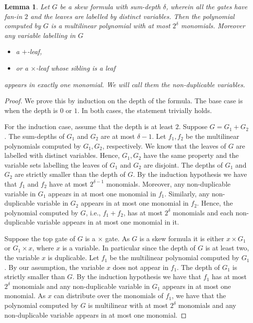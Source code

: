 \documentclass[10pt,a4paper]{article}
\newtheorem{lemma}[theorem]{Lemma}
\begin{document}
\begin{lemma}
	\label{lem:skew}
	Let $G$ be a skew formula with sum-depth $\delta$, wherein all the gates have fan-in $2$ and the leaves are labelled by distinct variables. Then the polynomial computed by $G$ is a multilinear polynomial with at most $2^\delta$ monomials. Moreover any variable labelling in \(G\) 
	\begin{itemize}
		\item a $+$-leaf,
		\item or a \(\times\)-leaf whose sibling is a leaf
	\end{itemize}
	appears in exactly one monomial. We will call them the {\em non-duplicable} variables. 
\end{lemma}
\begin{proof}
	We prove this by induction on the depth of the formula. The base case is when the depth is $0$ or \(1\).
	In both cases, the statement trivially holds. 
	
	For the induction case, assume that the depth is at least \(2\). 
	Suppose $G = G_1 + G_2$. The sum-depths of $G_1$ and $G_2$ are at most $\delta-1$. Let $f_1,f_2$ be the multilinear polynomials computed by $G_1, G_2$, respectively. We know that the leaves of $G$ are labelled with distinct variables. Hence, $G_1, G_2$ have the same property and the variable sets labelling the leaves of $G_1$ and $G_2$ are disjoint. 
	The depths of $G_1$ and $G_2$ are strictly smaller than the depth of $G$. By the induction hypothesis we have that $f_1$ and $f_2$ have at most $2^{\delta-1}$ monomials.  Moreover, any non-duplicable variable in $G_1$ appears in at most one monomial in $f_1$. Similarly, any non-duplicable variable in $G_2$ appears in at most one monomial in $f_2$. Hence, the polynomial computed by $G$, i.e., $f_1+f_2$,  has at most $2^\delta$ monomials and each non-duplicable variable appears in at most one monomial in it. 
	
	Suppose the top gate of $G$ is a $\times$ gate. As $G$ is a skew formula it is either  $x \times G_1$ or $G_1 \times x$, where $x$ is a variable. In particular since the depth of \(G\) is at least two, the variable \(x\) is duplicable. Let $f_1$ be the multilinear polynomial computed by $G_1$. By our assumption, the variable $x$ does not appear in $f_1$. The depth of $G_1$ is strictly smaller than $G$.  By the induction hypothesis we have that $f_1$ has at most $2^\delta$ monomials and any non-duplicable variable in $G_1$ appears in at most one monomial. As $x$ can distribute over the monomials of $f_1$, we have that the polynomial computed by $G$ is multilinear with at most $2^\delta$ monomials and any non-duplicable variable appears in at most one monomial.  
	

\end{proof}
\end{document}
